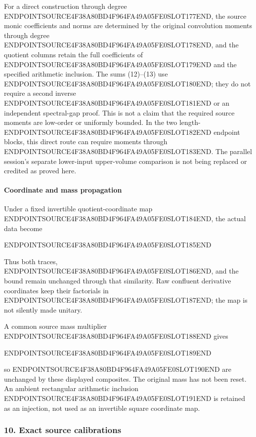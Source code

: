 For a direct construction through degree ENDPOINTSOURCE4F38A80BD4F964FA49A05FE0SLOT177END, the source monic coefficients and norms are determined by the original convolution moments through degree ENDPOINTSOURCE4F38A80BD4F964FA49A05FE0SLOT178END, and the quotient columns retain the full coefficients of ENDPOINTSOURCE4F38A80BD4F964FA49A05FE0SLOT179END and the specified arithmetic inclusion. The sums (12)--(13) use ENDPOINTSOURCE4F38A80BD4F964FA49A05FE0SLOT180END; they do not require a second inverse ENDPOINTSOURCE4F38A80BD4F964FA49A05FE0SLOT181END or an independent spectral-gap proof. This is not a claim that the required source moments are low-order or uniformly bounded. In the two length-ENDPOINTSOURCE4F38A80BD4F964FA49A05FE0SLOT182END endpoint blocks, this direct route can require moments through ENDPOINTSOURCE4F38A80BD4F964FA49A05FE0SLOT183END. The parallel session's separate lower-input upper-volume comparison is not being replaced or credited as proved here.

\paragraph{Coordinate and mass propagation}\label{endpoint-relation_moment_original--coordinate-and-mass-propagation}

Under a fixed invertible quotient-coordinate map ENDPOINTSOURCE4F38A80BD4F964FA49A05FE0SLOT184END, the actual data become

ENDPOINTSOURCE4F38A80BD4F964FA49A05FE0SLOT185END

Thus both traces, ENDPOINTSOURCE4F38A80BD4F964FA49A05FE0SLOT186END, and the bound remain unchanged through that similarity. Raw confluent derivative coordinates keep their factorials in ENDPOINTSOURCE4F38A80BD4F964FA49A05FE0SLOT187END; the map is not silently made unitary.

A common source mass multiplier ENDPOINTSOURCE4F38A80BD4F964FA49A05FE0SLOT188END gives

ENDPOINTSOURCE4F38A80BD4F964FA49A05FE0SLOT189END

so ENDPOINTSOURCE4F38A80BD4F964FA49A05FE0SLOT190END are unchanged by these displayed composites. The original mass has not been reset. An ambient rectangular arithmetic inclusion ENDPOINTSOURCE4F38A80BD4F964FA49A05FE0SLOT191END is retained as an injection, not used as an invertible square coordinate map.

\subsubsection{10. Exact source calibrations}\label{endpoint-relation_moment_original--exact-source-calibrations}

